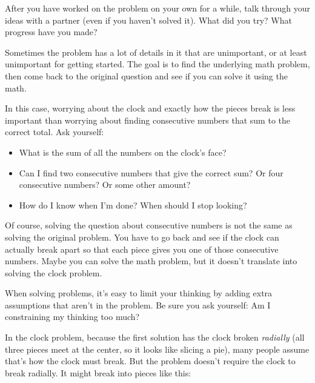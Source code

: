 \begin{thinkpair*}
After you have worked on the problem on your own for a while, talk through your ideas with a partner (even if you haven't solved it).  What did you try?   What progress have you made?
\end{thinkpair*}


\begin{ps}
Sometimes the problem has a lot of details in it that are unimportant, or at least unimportant for getting started.  The goal is to find the underlying math problem, then come back to the original question and see if you can solve it using the math.
\end{ps}

In this case, worrying about the clock and exactly how the pieces break is less important than worrying about finding consecutive numbers that sum to the correct total.  Ask yourself: 
\begin{itemize}
\item
What is the sum of all the numbers on the clock's face?  
\item
Can I find two consecutive numbers that give the correct sum?  Or four consecutive numbers?  Or some other amount?
\item
How do I know when I'm done?  When should I stop looking?
\end{itemize}

Of course, solving the question about consecutive numbers is not the same as solving the original problem.  You have to go back and see if the clock can actually break apart so that each piece gives you one of those consecutive numbers.  Maybe you can solve the math problem, but it doesn't translate into solving the clock problem.

\begin{ps}
When solving problems, it's easy to limit your thinking by adding extra assumptions that aren't in the problem.  Be sure you ask yourself: Am I constraining my thinking too much?
\end{ps}

In the clock problem, because the first solution has the clock broken \emph{radially} (all three pieces meet at the center, so it looks like slicing a pie), many people assume that's how the clock must break.  But the problem doesn't require the clock to break radially.  It might break into pieces like this:



